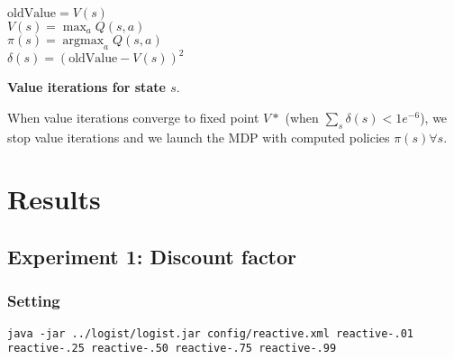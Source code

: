 \documentclass[11pt]{article}
\DeclareMathOperator*{\argmax}{argmax}
\begin{document}
\begin{algorithm}[h]
    $\text{oldValue} = V(s)$\\
    $V(s) = \max_a Q(s,a)$\\
    $\pi(s) = \argmax_a Q(s,a)$\\
    $\delta(s) = \left( \text{oldValue} - V(s) \right)^2$
	\caption{\textbf{Value iterations for state $s$}.}
	\label{algo}
\end{algorithm}

\newpage
When value iterations converge to fixed point $V*$ (when $\sum_s \delta(s) < 1e^{-6}$), we stop value iterations and we launch the MDP with computed policies $\pi(s) \forall s$.

\section{Results}

\subsection{Experiment 1: Discount factor}

\subsubsection{Setting}

\begin{verbatim}
java -jar ../logist/logist.jar config/reactive.xml reactive-.01 reactive-.25 reactive-.50 reactive-.75 reactive-.99
\end{verbatim}
\end{document}
